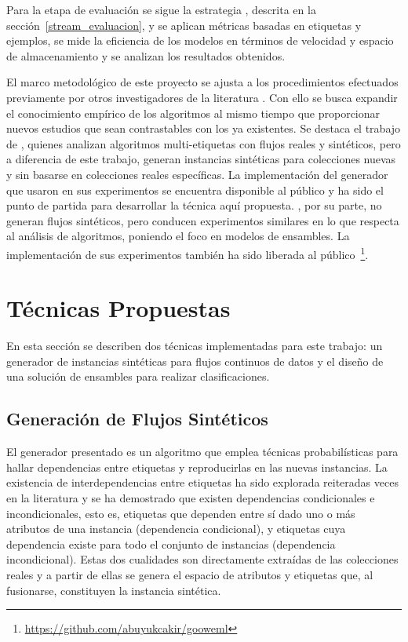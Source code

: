 Para la etapa de evaluación se sigue la estrategia
, descrita en la
sección~\ref{stream_evaluacion}, y se aplican métricas basadas en etiquetas y
ejemplos, se mide la eficiencia de los modelos en términos de velocidad y
espacio de almacenamiento y se analizan los resultados obtenidos.

El marco metodológico de este proyecto se ajusta a los procedimientos efectuados
previamente por otros investigadores de la literatura
\cite{osojnik_multi-label_2017, sousa_multi-label_2018, buyukcakir_novel_2018,
	zheng_survey_2020, read_scalable_2012}. Con ello se busca expandir el
conocimiento empírico de los algoritmos al mismo tiempo que proporcionar nuevos
estudios que sean contrastables con los ya existentes.  Se destaca el trabajo de
\citeauthor{read_scalable_2012} \cite{read_scalable_2012}, quienes analizan
algoritmos multi-etiquetas con flujos reales y sintéticos, pero a diferencia de
este trabajo, generan instancias sintéticas para colecciones nuevas y sin
basarse en colecciones reales específicas. La implementación del generador que
usaron en sus experimentos se encuentra disponible al público
\cite{read_moa_2012} y ha sido el punto de partida para desarrollar la técnica
aquí propuesta.  \citeauthor{buyukcakir_novel_2018}, por su parte, no generan
flujos sintéticos, pero conducen experimentos similares en lo que respecta al
análisis de algoritmos, poniendo el foco en modelos de ensambles.  La
implementación de sus experimentos también ha sido liberada al
público~\footnote{\url{https://github.com/abuyukcakir/gooweml}}.

\section{Técnicas Propuestas}

En esta sección se describen dos técnicas implementadas para este trabajo: un
generador de instancias sintéticas para flujos continuos de datos y el diseño de
una solución de ensambles para realizar clasificaciones.

\subsection{Generación de Flujos Sintéticos}
\label{generacion_flujos_sinteticos}

El generador presentado es un algoritmo que emplea técnicas probabilísticas para
hallar dependencias entre etiquetas y reproducirlas en las nuevas instancias. La
existencia de interdependencias entre etiquetas ha sido explorada reiteradas
veces en la literatura \cite{tsoumakas_multi-label_2007, read_multi-label_2008}
y se ha demostrado que existen dependencias condicionales e incondicionales,
esto es, etiquetas que dependen entre sí dado uno o más atributos de una
instancia (dependencia condicional), y etiquetas cuya dependencia existe para
todo el conjunto de instancias (dependencia incondicional). Estas dos cualidades
son directamente extraídas de las colecciones reales y a partir de ellas se
genera el espacio de atributos y etiquetas que, al fusionarse, constituyen la
instancia sintética.

